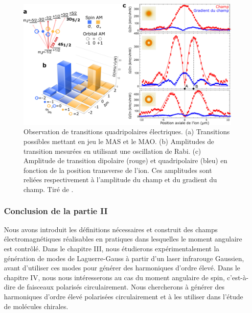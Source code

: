 \begin{figure}[!ht]
\centering
\includegraphics[width=0.9\columnwidth]{Figures/schmiegelow.png}
\caption{Observation de transitions quadripolaires électriques. (a) Transitions possibles mettant en jeu le MAS et le MAO. (b) Amplitudes de transition mesurées en utilisant une oscillation de Rabi. (c) Amplitude de transition dipolaire (rouge) et quadripolaire (bleu) en fonction de la position transverse de l'ion. Ces amplitudes sont reliées respectivement à l'amplitude du champ et du gradient du champ. Tiré de .}
\label{Fig:Schmiegelow}
\end{figure}

\subsubsection{Conclusion de la partie II}
Nous avons introduit les définitions nécessaires et construit des champs électromagnétiques réalisables en pratiques dans lesquelles le moment angulaire est contrôlé. Dans le chapitre III, nous étudierons expérimentalement la génération de modes de Laguerre-Gauss à partir d'un laser infrarouge Gaussien, avant d'utiliser ces modes pour générer des harmoniques d'ordre élevé. Dans le chapitre IV, nous nous intéresserons au cas du moment angulaire de spin, c'est-à-dire de faisceaux polarisés circulairement. Nous chercherons à générer des harmoniques d'ordre élevé polarisées circulairement et à les utiliser dans l'étude de molécules chirales.